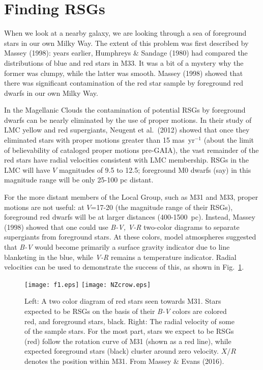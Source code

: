 \documentclass{iau}
\begin{document}
\section{Finding RSGs}

When we look at a nearby galaxy, we are looking through a sea of foreground stars in our own Milky Way.  The extent of this problem was first described by Massey (1998): years earlier, Humphreys \& Sandage (1980) had compared the distributions of  blue and red stars in M33.  It was a bit of a mystery why the former was clumpy, while the latter was smooth. Massey (1998) showed that there was significant contamination of the red star sample by foreground red dwarfs in our own Milky Way. 

 In the Magellanic Clouds the contamination of potential RSGs by foreground dwarfs can be nearly eliminated by the use of proper motions. In their study of LMC yellow and red supergiants, Neugent et al.\ (2012) showed that once they eliminated stars with proper motions greater than 15 mas~yr$^{-1}$ (about the limit of believability of cataloged proper motions pre-GAIA), the vast remainder of the red stars have radial velocities consistent with LMC membership.  RSGs in
 the LMC will have $V$ magnitudes of 9.5 to 12.5; foreground M0 dwarfs (say) in this magnitude range will be only 25-100 pc distant. 
 
 
 For the more distant members of the Local Group, such as M31 and M33, proper motions are not useful: at $V$=17-20 (the magnitude range of their RSGs), foreground red dwarfs will be at larger distances (400-1500~pc).  Instead, Massey (1998) showed that one could use {\it B-V, V-R} two-color diagrams to separate supergiants from foreground stars.  At these colors, model atmospheres suggested that {\it B-V} would become primarily a surface gravity indicator due to line blanketing in the blue, while {\it V-R} remains a temperature indicator.  Radial velocities can be used to demonstrate the success of this, as shown in Fig.~\ref{fig:kate}.
 
 \begin{figure}[t]
\begin{center}
\texttt{[image: f1.eps]} 
\texttt{[image: NZcrow.eps]}
\caption{Left: A two color diagram of red stars seen towards M31.  Stars expected to be RSGs on the basis of their {\it B-V} colors are colored red, and foreground stars, black.  Right:  The radial velocity of some of the sample stars. For the most part, stars we expect to be RSGs (red) follow the rotation curve of M31 (shown as a red line), while expected foreground stars (black) cluster around zero velocity.   $X/R$ denotes the position within M31.  From Massey \& Evans (2016).}
 \label{fig:kate}
\end{center}
\end{figure}
\end{document}
